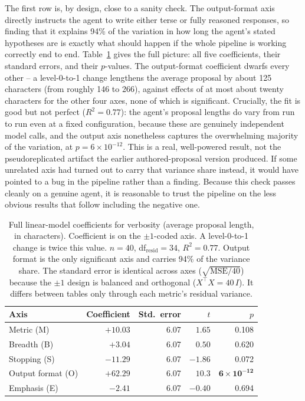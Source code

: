 \documentclass[11pt]{article}
\begin{document}
The first row is, by design, close to a sanity check. The output-format axis directly instructs the agent to write either terse or fully reasoned responses, so finding that it explains 94\% of the variation in how long the agent's stated hypotheses are is exactly what should happen if the whole pipeline is working correctly end to end. Table~\ref{tab:coef-verbosity} gives the full picture: all five coefficients, their standard errors, and their $p$-values. The output-format coefficient dwarfs every other -- a level-0-to-1 change lengthens the average proposal by about 125 characters (from roughly 146 to 266), against effects of at most about twenty characters for the other four axes, none of which is significant. Crucially, the fit is good but not perfect ($R^2=0.77$): the agent's proposal lengths do vary from run to run even at a fixed configuration, because these are genuinely independent model calls, and the output axis nonetheless captures the overwhelming majority of the variation, at $p=6\times10^{-12}$. This is a real, well-powered result, not the pseudoreplicated artifact the earlier authored-proposal version produced. If some unrelated axis had turned out to carry that variance share instead, it would have pointed to a bug in the pipeline rather than a finding. Because this check passes cleanly on a genuine agent, it is reasonable to trust the pipeline on the less obvious results that follow including the negative one.

\begin{table}[h]
\centering
\caption{Full linear-model coefficients for verbosity (average proposal length, in characters). Coefficient is on the $\pm1$-coded axis. A level-0-to-1 change is twice this value. $n=40$, df$_{\text{resid}}=34$, $R^2=0.77$. Output format is the only significant axis and carries 94\% of the variance share. The standard error is identical across axes ($\sqrt{\text{MSE}/40}$) because the $\pm1$ design is balanced and orthogonal ($X^\top X = 40\,I$). It differs between tables only through each metric's residual variance.}
\label{tab:coef-verbosity}
\begin{tabular}{lrrrr}
\toprule
Axis & Coefficient & Std.\ error & $t$ & $p$ \\
\midrule
Metric (M) & $+10.03$ & 6.07 & $1.65$ & 0.108 \\
Breadth (B) & $+3.04$ & 6.07 & $0.50$ & 0.620 \\
Stopping (S) & $-11.29$ & 6.07 & $-1.86$ & 0.072 \\
Output format (O) & $+62.29$ & 6.07 & $10.3$ & $\mathbf{6\times10^{-12}}$ \\
Emphasis (E) & $-2.41$ & 6.07 & $-0.40$ & 0.694 \\
\bottomrule
\end{tabular}
\end{table}
\end{document}
